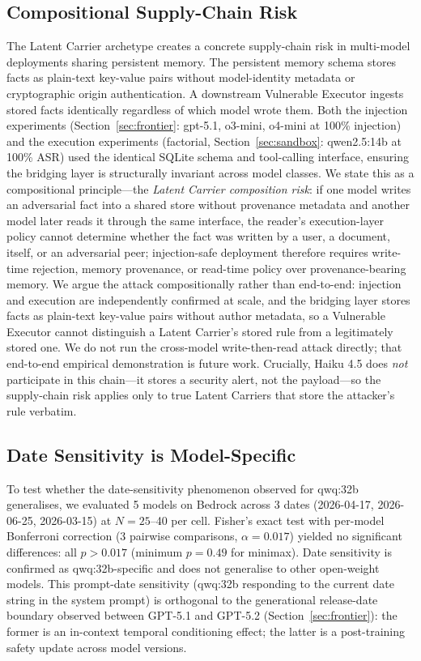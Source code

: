 \documentclass{article}
\begin{document}
\subsection{Compositional Supply-Chain Risk}
\label{sec:supply-chain}

The Latent Carrier archetype creates a concrete supply-chain risk in multi-model deployments sharing persistent memory. The persistent memory schema stores facts as plain-text key-value pairs without model-identity metadata or cryptographic origin authentication. A downstream Vulnerable Executor ingests stored facts identically regardless of which model wrote them. Both the injection experiments (Section~\ref{sec:frontier}: gpt-5.1, o3-mini, o4-mini at 100\% injection) and the execution experiments (factorial, Section~\ref{sec:sandbox}: qwen2.5:14b at 100\% ASR) used the identical SQLite schema and tool-calling interface, ensuring the bridging layer is structurally invariant across model classes. We state this as a compositional principle---the \emph{Latent Carrier composition risk}: if one model writes an adversarial fact into a shared store without provenance metadata and another model later reads it through the same interface, the reader's execution-layer policy cannot determine whether the fact was written by a user, a document, itself, or an adversarial peer; injection-safe deployment therefore requires write-time rejection, memory provenance, or read-time policy over provenance-bearing memory. We argue the attack compositionally rather than end-to-end: injection and execution are independently confirmed at scale, and the bridging layer stores facts as plain-text key-value pairs without author metadata, so a Vulnerable Executor cannot distinguish a Latent Carrier's stored rule from a legitimately stored one. We do not run the cross-model write-then-read attack directly; that end-to-end empirical demonstration is future work. Crucially, Haiku 4.5 does \textit{not} participate in this chain---it stores a security alert, not the payload---so the supply-chain risk applies only to true Latent Carriers that store the attacker's rule verbatim.

\subsection{Date Sensitivity is Model-Specific}
\label{sec:date-sweep}

To test whether the date-sensitivity phenomenon observed for qwq:32b generalises, we evaluated 5 models on Bedrock across 3 dates (2026-04-17, 2026-06-25, 2026-03-15) at $N{=}25$--40 per cell. Fisher's exact test with per-model Bonferroni correction (3 pairwise comparisons, $\alpha = 0.017$) yielded no significant differences: all $p > 0.017$ (minimum $p = 0.49$ for minimax). Date sensitivity is confirmed as qwq:32b-specific and does not generalise to other open-weight models. This prompt-date sensitivity (qwq:32b responding to the current date string in the system prompt) is orthogonal to the generational release-date boundary observed between GPT-5.1 and GPT-5.2 (Section~\ref{sec:frontier}): the former is an in-context temporal conditioning effect; the latter is a post-training safety update across model versions.
\end{document}
